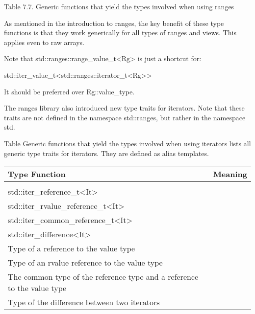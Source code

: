 \begin{center}
Table 7.7. Generic functions that yield the types involved when using ranges
\end{center}

As mentioned in the introduction to ranges, the key benefit of these type functions is that they work generically for all types of ranges and views. This applies even to raw arrays.

Note that std::ranges::range\_value\_t<Rg> is just a shortcut for:

\begin{cpp}
std::iter_value_t<std::ranges::iterator_t<Rg>>
\end{cpp}

It should be preferred over Rg::value\_type.


The ranges library also introduced new type traits for iterators. Note that these traits are not defined in the namespace std::ranges, but rather in the namespace std.

Table Generic functions that yield the types involved when using iterators lists all generic type traits for iterators. They are defined as alias templates.


\begin{longtable}[c]{|l|l|}
	\hline
	\textbf{Type Function} &
	\textbf{Meaning} \\ \hline
	\endfirsthead
	\endhead
	\begin{tabular}[c]{@{}l@{}}std::iter\_value\_t\textless{}It\textgreater\\ std::iter\_reference\_t\textless{}It\textgreater\\ std::iter\_rvalue\_reference\_t\textless{}It\textgreater\\ std::iter\_common\_reference\_t\textless{}It\textgreater\\ std::iter\_difference\textless{}It\textgreater{}\end{tabular} &
	\begin{tabular}[c]{@{}l@{}}Type of the value that the iterator refers to\\ Type of a reference to the value type\\ Type of an rvalue reference to the value type\\ The common type of the reference type and a reference to the value type\\ Type of the difference between two iterators\end{tabular} \\ \hline
\end{longtable}

